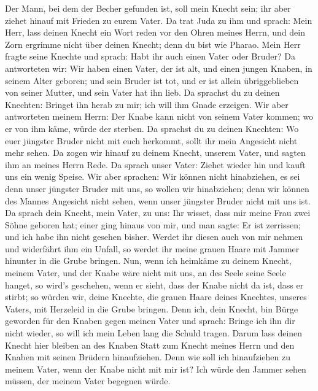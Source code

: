 Der Mann, bei dem der Becher gefunden ist, soll mein Knecht sein; ihr
aber ziehet hinauf mit Frieden zu eurem Vater.  Da trat
Juda zu ihm und sprach: Mein Herr, lass deinen Knecht ein Wort reden vor
den Ohren meines Herrn, und dein Zorn ergrimme nicht über deinen Knecht;
denn du bist wie Pharao.  Mein Herr fragte seine Knechte
und sprach: Habt ihr auch einen Vater oder Bruder?  Da
antworteten wir: Wir haben einen Vater, der ist alt, und einen jungen
Knaben, in seinem Alter geboren; und sein Bruder ist tot, und er ist
allein übriggeblieben von seiner Mutter, und sein Vater hat ihn lieb.
 Da sprachst du zu deinen Knechten: Bringet ihn herab zu
mir; ich will ihm Gnade erzeigen.  Wir aber antworteten
meinem Herrn: Der Knabe kann nicht von seinem Vater kommen; wo er von
ihm käme, würde der sterben.  Da sprachst du zu deinen
Knechten: Wo euer jüngster Bruder nicht mit euch herkommt, sollt ihr
mein Angesicht nicht mehr sehen.  Da zogen wir hinauf zu
deinem Knecht, unserem Vater, und sagten ihm an meines Herrn Rede.
 Da sprach unser Vater: Ziehet wieder hin und kauft uns
ein wenig Speise.  Wir aber sprachen: Wir können nicht
hinabziehen, es sei denn unser jüngster Bruder mit uns, so wollen wir
hinabziehen; denn wir können des Mannes Angesicht nicht sehen, wenn
unser jüngster Bruder nicht mit uns ist.  Da sprach dein
Knecht, mein Vater, zu uns: Ihr wisset, dass mir meine Frau zwei Söhne
geboren hat;  einer ging hinaus von mir, und man sagte:
Er ist zerrissen; und ich habe ihn nicht gesehen bisher. 
Werdet ihr diesen auch von mir nehmen und widerfährt ihm ein Unfall, so
werdet ihr meine grauen Haare mit Jammer hinunter in die Grube bringen.
 Nun, wenn ich heimkäme zu deinem Knecht, meinem Vater,
und der Knabe wäre nicht mit uns, an des Seele seine Seele hanget,
 so wird's geschehen, wenn er sieht, dass der Knabe nicht
da ist, dass er stirbt; so würden wir, deine Knechte, die grauen Haare
deines Knechtes, unseres Vaters, mit Herzeleid in die Grube bringen.
 Denn ich, dein Knecht, bin Bürge geworden für den Knaben
gegen meinen Vater und sprach: Bringe ich ihn dir nicht wieder, so will
ich mein Leben lang die Schuld tragen.  Darum lass deinen
Knecht hier bleiben an des Knaben Statt zum Knecht meines Herrn und den
Knaben mit seinen Brüdern hinaufziehen.  Denn wie soll
ich hinaufziehen zu meinem Vater, wenn der Knabe nicht mit mir ist? Ich
würde den Jammer sehen müssen, der meinem Vater begegnen würde.

